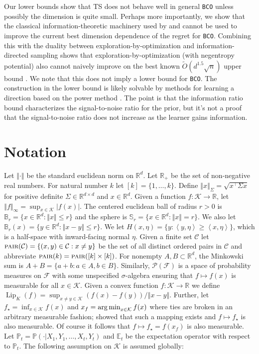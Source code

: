\documentclass[letter, 12pt]{report}
\newcommand{\pair}{\operatorname{\textsc{pair}}}
\newcommand{\R}{\mathbb R}
\newcommand{\argmin}{\operatornamewithlimits{arg\,min}}
\newcommand{\ip}[1]{\left \langle #1 \right \rangle}
\newcommand{\sphere}{\mathbb{S}}
\newcommand{\ball}{\mathbb{B}}
\newcommand{\norm}[1]{\left \Vert  #1 \right \Vert}
\newcommand{\E}{\mathbb E}
\newcommand{\cK}{\mathcal K}
\newcommand{\cC}{\mathcal C}
\newcommand{\sF}{\mathscr F}
\newcommand{\sP}{\mathscr P}
\newcommand{\bbP}{\mathbb P}
\newcommand{\lip}{\operatorname{Lip}}
\newcommand{\1}{\mathbf{1}}
\newcommand{\bco}{\texttt{BCO}\xspace}
\newcommand{\ts}{\textsc{TS}\xspace}
\theoremstyle{plain}
\theoremstyle{definition}
\theoremstyle{remark}
\begin{document}
Our lower bounds show that \ts does not behave well in general \bco unless possibly the dimension is quite small.
Perhaps more importantly, we show that the classical information-theoretic machinery used by \cite{BE18} and \cite{Lat20-cvx} cannot be used to improve the current
best dimension dependence of the regret for \bco.
Combining this with the duality between exploration-by-optimization and information-directed sampling
shows that exploration-by-optimization (with negentropy potential) also cannot naively improve on the best known $\tilde O(d^{1.5} \sqrt{n})$ upper bound \citep{ZL19,LG23}.
We note that this does not imply a lower bound for \bco.
The construction in the lower bound is likely solvable by methods for learning a direction based on the power method \citep{lattimore2021bandit,huang2021optimal}.
The point is that the information ratio bound characterizes the signal-to-noise ratio for the prior, but it's not a proof that the signal-to-noise ratio does not increase
as the learner gains information.

\section{Notation}
Let $\norm{\cdot}$ be the standard euclidean norm on $\R^d$.
Let $\R_+$ be the set of non-negative real numbers.
For natural number $k$ let $[k] = \{1,\ldots,k\}$.
Define $\norm{x}_\Sigma = \sqrt{x^\top \Sigma x}$ for positive definite $\Sigma \in \R^{d\times d}$ and $x \in \R^d$.
Given a function $f : \cK \to \R$, let $\norm{f}_\infty = \sup_{x \in \cK} |f(x)|$.
The centered euclidean ball of radius $r > 0$ is $\ball_r = \{x \in \R^d : \norm{x} \leq r\}$ and
the sphere is $\sphere_r = \{x \in \R^d : \norm{x} = r\}$. We also let $\ball_r(x) = \{y \in \R^d : \norm{x - y} \leq r\}$.
We let $H(x, \eta) = \{y : \ip{y, \eta} \geq \ip{x, \eta}\}$, which is a half-space with inward-facing normal $\eta$.
Given a finite set $\cC$ let $\pair(\cC) = \{(x, y) \in \cC : x \neq y\}$ be the set of all distinct ordered pairs in $\cC$ and abbreviate $\pair(k) = \pair([k] \times [k])$.
For nonempty $A,B\subset\mathbb{R}^d$, the Minkowski sum is $A+B=\{a+b:a\in A,b\in B\}$.
Similarly, $\sP(\sF)$ is a space of probability measures on $\sF$ with some unspecified $\sigma$-algebra ensuring that $f \mapsto f(x)$
is measurable for all $x \in \cK$.
Given a convex function $f : \cK \to \R$ we define $\lip_K(f) = \sup_{x \neq y \in \cK} (f(x) - f(y)) / \norm{x - y}$.
Further, let $f_\star = \inf_{x \in \cK} f(x)$ and $x_f = \argmin_{x \in \cK} f(x)$ where ties are broken in an arbitrary measurable fashion;
\citep{niemiro1992asymptotics} showed that such a mapping exists and $f \mapsto f_\star$ is also measurable.
Of course it follows that $f \mapsto f_\star = f(x_f)$ is also measurable.
Let $\bbP_t = \bbP(\cdot|X_1,Y_1,\ldots,X_t,Y_t)$ and $\E_t$ be the expectation operator with respect to $\bbP_t$.
The following assumption on $\cK$ is assumed globally:
\end{document}

